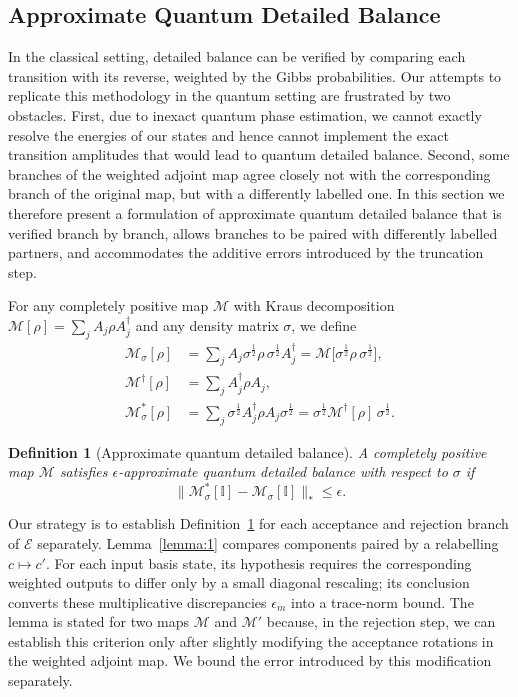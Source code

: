 \documentclass[aps,floatfix,10pt,amssymb,amsfont,amsmath,superscriptaddress,float,nofootinbib,longbibliography,nobalancelastpage,twocolumn]{revtex4-2}
\newtheorem{definition}{Definition}
\begin{document}
\subsection{Approximate Quantum Detailed Balance}
\label{section:detailedbalancedef}
In the classical setting, detailed balance can be verified by comparing each transition with its reverse, weighted by the Gibbs probabilities. Our attempts to replicate this methodology in the quantum setting are frustrated by two obstacles. First, due to inexact quantum phase estimation, we cannot exactly resolve the energies of our states and hence cannot implement the exact transition amplitudes that would lead to quantum detailed balance. Second, some branches of the weighted adjoint map agree closely not with the corresponding branch of the original map, but with a differently labelled one. In this section we therefore present a formulation of approximate quantum detailed balance that is verified branch by branch, allows branches to be paired with differently labelled partners, and accommodates the additive errors introduced by the truncation step.

For any completely positive map $\mathcal{M}$ with Kraus decomposition $\mathcal{M}[\rho] = \sum_{j} A_{j}\rho A^{\dagger}_{j}$ and any density matrix $\sigma$, we define
\begin{align}
    \mathcal{M}_{\sigma}[\rho] &= \sum_{j} A_{j}\sigma^{\frac{1}{2}}\rho\,\sigma^{\frac{1}{2}} A^{\dagger}_{j} = \mathcal{M}\big[\sigma^{\frac{1}{2}}\rho\,\sigma^{\frac{1}{2}}\big],\\
    \mathcal{M}^{\dagger}[\rho] &= \sum_j A^{\dagger}_j \rho A_j,\\
    \mathcal{M}^*_{\sigma}[\rho] &= \sum_{j} \sigma^{\frac{1}{2}}A^{\dagger}_{j}\rho A_{j}\sigma^{\frac{1}{2}} = \sigma^{\frac{1}{2}}\mathcal{M}^{\dagger}[\rho]\,\sigma^{\frac{1}{2}}.
\end{align}

\begin{definition}[Approximate quantum detailed balance]
\label{def:approxdb}
A completely positive map $\mathcal{M}$ satisfies $\epsilon$-approximate quantum
detailed balance with respect to $\sigma$ if
\begin{equation}
    \|\mathcal{M}^*_{\sigma}[\mathbb{I}] - \mathcal{M}_{\sigma}[\mathbb{I}]\|_* \leq \epsilon.
\end{equation}
\end{definition}

Our strategy is to establish Definition~\ref{def:approxdb} for each acceptance and rejection branch of $\mathcal{E}$ separately. Lemma~\ref{lemma:1} compares components paired by a relabelling $c\mapsto c'$. For each input basis state, its hypothesis requires the corresponding weighted outputs to differ only by a small diagonal rescaling; its conclusion converts these multiplicative discrepancies $\epsilon_{m}$ into a trace-norm bound. The lemma is stated for two maps $\mathcal{M}$ and $\mathcal{M}'$ because, in the rejection step, we can establish this criterion only after slightly modifying the acceptance rotations in the weighted adjoint map. We bound the error introduced by this modification separately.
\end{document}
